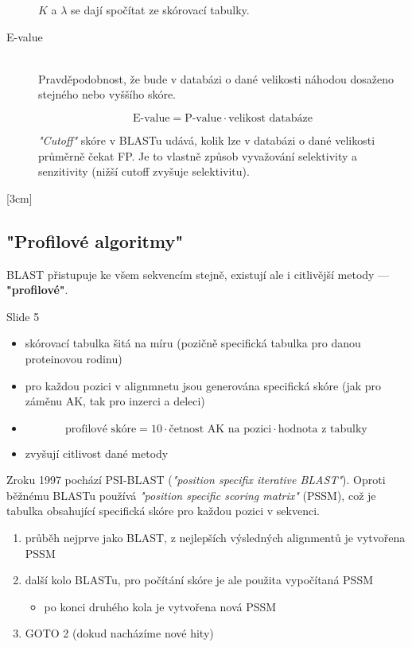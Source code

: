 \documentclass[DIV=8]{scrreprt}
\begin{document}
\begin{description}
\(K\) a \(\lambda\) se dají spočítat ze skórovací tabulky.


\item[E-value]\hfill \\
Pravděpodobnost, že bude v databázi o dané velikosti náhodou dosaženo stejného nebo vyššího skóre.

\[\text{E-value} = \text{P-value} \cdot \text{velikost databáze}\]

\emph{"Cutoff"} skóre v BLASTu udává, kolik lze v databázi o dané velikosti průměrně čekat FP. Je to vlastně způsob vyvažování selektivity a senzitivity (nižší cutoff zvyšuje selektivitu).

\end{description}


[3cm]
\subsection{"Profilové algoritmy"}

BLAST přistupuje ke všem sekvencím stejně, existují ale i citlivější metody --- \textbf{"profilové"}.

Slide 5
\begin{itemize}
    \item skórovací tabulka šitá na míru (pozičně specifická tabulka pro danou proteinovou rodinu)
    \item pro každou pozici v alignmnetu jsou generována specifická skóre (jak pro záměnu AK, tak pro inzerci a deleci)
    \item \[\text{profilové skóre} = 10 \cdot \text{četnost AK na pozici} \cdot \text{hodnota z tabulky}\]
    \item zvyšují citlivost dané metody
\end{itemize}


Zroku 1997 pochází PSI-BLAST (\emph{"position specifix iterative BLAST"}). Oproti běžnému BLASTu používá \emph{"position specific scoring matrix"} (PSSM), což je tabulka obsahující specifická skóre pro každou pozici v sekvenci.

\begin{enumerate}
    \item průběh nejprve jako BLAST, z nejlepších výsledných alignmentů je vytvořena PSSM
    \item další kolo BLASTu, pro počítání skóre je ale použita vypočítaná PSSM
\begin{itemize}
    \item po konci druhého kola je vytvořena nová PSSM
\end{itemize}

    \item GOTO 2 (dokud nacházíme nové hity)
\end{enumerate}
\end{document}
